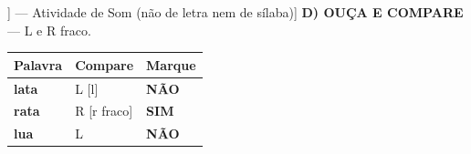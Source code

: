 \begin{exercicio}[Som /l/ [[l]] --- Atividade de Som (não de letra nem de sílaba)]
\textbf{D) OUÇA E COMPARE} --- L e R fraco.

\begin{center}
\begin{tabular}{@{}p{4.2cm}p{6.2cm}p{1.6cm}@{}}
\hline
\textbf{Palavra} & \textbf{Compare} & \textbf{Marque} \\
\hline
\textbf{lata} & L [l] & \textbf{NÃO} \\
\textbf{rata} & R [r fraco] & \textbf{SIM} \\
\textbf{lua} & L & \textbf{NÃO} \\
\hline
\end{tabular}
\end{center}

\end{exercicio}

